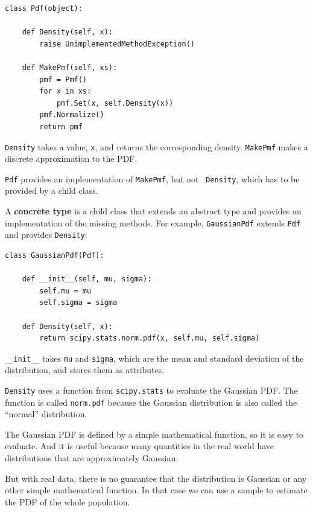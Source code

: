 \documentclass[12pt]{book}
\begin{document}
\begin{verbatim}
class Pdf(object):

    def Density(self, x):
        raise UnimplementedMethodException()

    def MakePmf(self, xs):
        pmf = Pmf()
        for x in xs:
            pmf.Set(x, self.Density(x))
        pmf.Normalize()
        return pmf
\end{verbatim}

{\tt Density} takes a value, {\tt x}, and returns the corresponding
density.  {\tt MakePmf} makes a discrete approximation to the PDF.

{\tt Pdf} provides an implementation of {\tt MakePmf}, but not {\tt
  Density}, which has to be provided by a child class.
  

A {\bf concrete type} is a child class that extends an abstract type
and provides an implementation of the missing methods.
For example, {\tt GaussianPdf} extends {\tt Pdf} and provides
{\tt Density}:

\begin{verbatim}
class GaussianPdf(Pdf):

    def __init__(self, mu, sigma):
        self.mu = mu
        self.sigma = sigma
        
    def Density(self, x):
        return scipy.stats.norm.pdf(x, self.mu, self.sigma)
\end{verbatim}

\verb"__init__" takes {\tt mu} and {\tt sigma}, which are
the mean and standard deviation of the distribution, and stores
them as attributes.

{\tt Density} uses a function from {\tt scipy.stats} to evaluate the
Gaussian PDF.  The function is called {\tt norm.pdf} because the
Gaussian distribution is also called the ``normal'' distribution. 

The Gaussian PDF is defined by a simple mathematical function,
so it is easy to evaluate.  And it is useful because many
quantities in the real world have distributions that are
approximately Gaussian.

But with real data, there is no guarantee that the distribution
is Gaussian or any other simple mathematical function.  In
that case we can use a sample to estimate the PDF of
the whole population.
\end{document}
